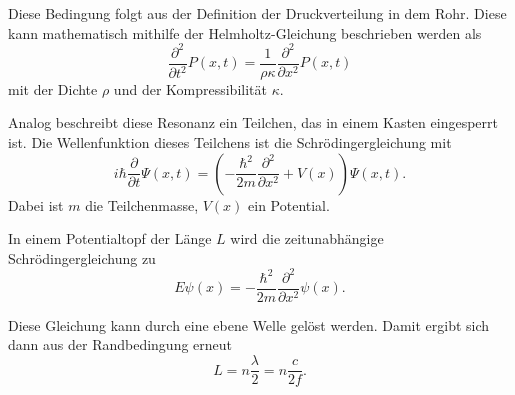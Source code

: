 Diese Bedingung folgt aus der Definition der Druckverteilung in dem Rohr. Diese kann mathematisch mithilfe der Helmholtz-Gleichung beschrieben werden als 
\begin{equation*}
    \frac{\partial^2}{\partial t^2} P(x,t) = \frac{1}{\rho\kappa}\frac{\partial^2}{\partial x^2} P(x,t)
\end{equation*}
mit der Dichte $\rho$ und der Kompressibilität $\kappa$. 

Analog beschreibt diese Resonanz ein Teilchen, das in einem Kasten eingesperrt ist. 
Die Wellenfunktion dieses Teilchens ist die Schrödingergleichung mit 
\begin{equation*}
    i \hbar \frac{\partial}{\partial t} \Psi(x,t) = (- \frac{\hbar^2}{2m} \frac{\partial^2}{\partial x^2} + V(x)) \Psi(x,t).
\end{equation*}
Dabei ist $m$ die Teilchenmasse, $V(x)$ ein Potential. 

In einem Potentialtopf der Länge $L$ wird die zeitunabhängige Schrödingergleichung zu 
\begin{equation*}
    E \psi(x) = - \frac{\hbar^2}{2m} \frac{\partial^2}{\partial x^2} \psi(x).
\end{equation*}

Diese Gleichung kann durch eine ebene Welle gelöst werden. Damit ergibt sich dann aus der Randbedingung erneut
\begin{equation*}
    L = n \frac{\lambda}{2} = n \frac{c}{2f}.
\end{equation*}

